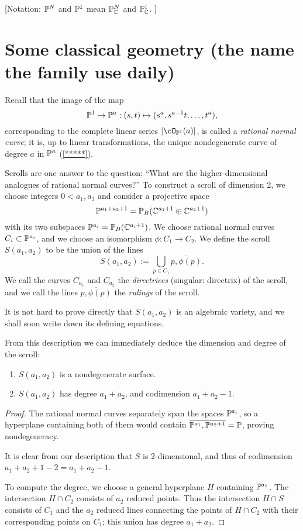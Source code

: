 [Notation:  $\PP^{N}$ and $\PP^{1}$ mean $\PP_{\CC}^{N}$ and $\PP_{\CC}^{1}$. ]

\section{Some classical geometry (the name the family use daily)}\label{daily name}

Recall that the image of the map 
$$
\PP^1\to\PP^a: (s,t) \mapsto (s^a, s^{a-1}t, \dots, t^a),
$$
corresponding to the complete linear series
$|\cO_{\PP^1}(a)|$, is called a \emph{rational normal curve}; it is, up to linear transformations, the unique nondegenerate curve of degree $a$ in $\PP^a$ (\ref{*****}).

Scrolls are one answer to the question: ``What are the higher-dimensional analogues of rational normal curves?'' To construct a scroll of dimension 2, we choose integers $0<a_1, a_2$ and consider  a projective space 
$$
\PP^{a_1+a_2+1} = \PP_B(\CC^{a_1+1}\oplus \CC^{a_2+1})
$$
with its two subspaces $\PP^{a_i} = \PP_B(\CC^{a_i+1})$. We choose rational normal curves $C_i\subset \PP^{a_i}$, and we choose an isomorphism $\phi: C_1\to C_2$. We define the scroll $S(a_1, a_2)$ to be the union of the lines
$$
S(a_1,a_2) := \bigcup_{p\in C_1} \overline{p, \phi(p)}.
$$
We call the curves $C_{a_{1}}$ and $C_{a_{2}}$ the \emph{directrices} (singular: directrix) of the scroll, and we call the lines $\overline{p, \phi(p)}$ the \emph{rulings} of the scroll.

It is not hard to prove directly that $S(a_1,a_2)$ is an algebraic variety, and we shall soon write down its defining equations.

From this description we can immediately deduce the dimension and degree of the scroll:
\begin{proposition}
\begin{enumerate}
\item $S(a_1,a_2)$ is a nondegenerate surface.
 \item $S(a_1,a_2)$ has degree $a_1+a_2$, and codimension $a_1+a_2-1.$
 \end{enumerate}

\end{proposition}\label{deg and codim}
\begin{proof}
 The rational normal curves separately span the spaces $\PP^{a_i}$, so a hyperplane containing both of them would contain $\overline{\PP^{a_1}, \PP^{a_{2}+1}} = \PP$, proving nondegeneracy. 
 
 It is clear from our description that $S$ is 2-dimensional, and thus of
codimension $a_{1}+a_{2}+1 -2 = a_{1}+a_{2}-1$. 

To compute the degree, we choose a general hyperplane $H$ containing $\PP^{a_{1}}$. The intersection $H\cap C_{2}$ consists of $a_{2}$ reduced points. Thus the intersection $H\cap S$ consists of $C_{1}$ and the $a_{2}$ reduced lines connecting 
the points of $H\cap C_{2}$ with their corresponding points on $C_{1}$; this union has degree $a_{1}+a_{2}$.
\end{proof}

